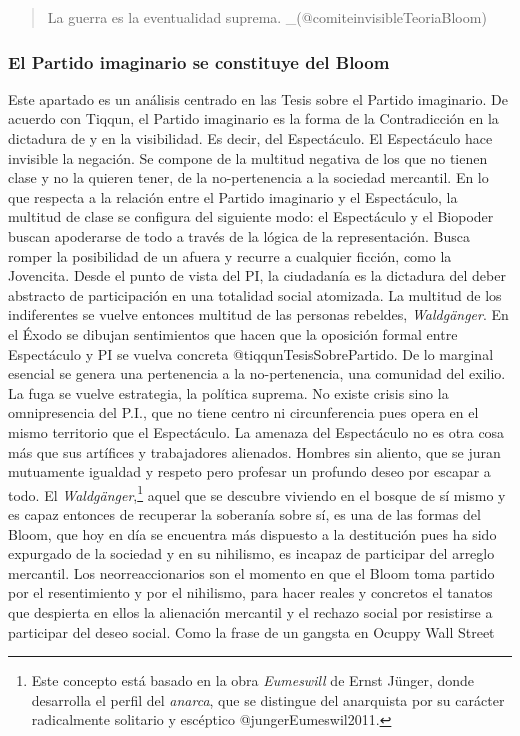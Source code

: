 \documentclass[
]{article}
\begin{document}
\begin{quote}
La guerra es la eventualidad suprema. \_(@comiteinvisibleTeoriaBloom)
\end{quote}

\hypertarget{el-partido-imaginario-se-constituye-del-bloom}{%
\subsubsection{El Partido imaginario se constituye del
Bloom}\label{el-partido-imaginario-se-constituye-del-bloom}}

Este apartado es un análisis centrado en las Tesis sobre el Partido
imaginario. De acuerdo con Tiqqun, el Partido imaginario es la forma de
la Contradicción en la dictadura de y en la visibilidad. Es decir, del
Espectáculo. El Espectáculo hace invisible la negación. Se compone de la
multitud negativa de los que no tienen clase y no la quieren tener, de
la no-pertenencia a la sociedad mercantil. En lo que respecta a la
relación entre el Partido imaginario y el Espectáculo, la multitud de
clase se configura del siguiente modo: el Espectáculo y el Biopoder
buscan apoderarse de todo a través de la lógica de la representación.
Busca romper la posibilidad de un afuera y recurre a cualquier ficción,
como la Jovencita. Desde el punto de vista del PI, la ciudadanía es la
dictadura del deber abstracto de participación en una totalidad social
atomizada. La multitud de los indiferentes se vuelve entonces multitud
de las personas rebeldes, \emph{Waldgänger}. En el Éxodo se dibujan
sentimientos que hacen que la oposición formal entre Espectáculo y PI se
vuelva concreta @tiqqunTesisSobrePartido. De lo marginal esencial se
genera una pertenencia a la no-pertenencia, una comunidad del exilio. La
fuga se vuelve estrategia, la política suprema. No existe crisis sino la
omnipresencia del P.I., que no tiene centro ni circunferencia pues opera
en el mismo territorio que el Espectáculo. La amenaza del Espectáculo no
es otra cosa más que sus artífices y trabajadores alienados. Hombres sin
aliento, que se juran mutuamente igualdad y respeto pero profesar un
profundo deseo por escapar a todo. El \emph{Waldgänger},\footnote{Este
  concepto está basado en la obra \emph{Eumeswill} de Ernst Jünger,
  donde desarrolla el perfil del \emph{anarca}, que se distingue del
  anarquista por su carácter radicalmente solitario y escéptico
  @jungerEumeswil2011. } aquel que se descubre viviendo en el bosque de
sí mismo y es capaz entonces de recuperar la soberanía sobre sí, es una
de las formas del Bloom, que hoy en día se encuentra más dispuesto a la
destitución pues ha sido expurgado de la sociedad y en su nihilismo, es
incapaz de participar del arreglo mercantil. Los neorreaccionarios son
el momento en que el Bloom toma partido por el resentimiento y por el
nihilismo, para hacer reales y concretos el tanatos que despierta en
ellos la alienación mercantil y el rechazo social por resistirse a
participar del deseo social. Como la frase de un gangsta en Ocuppy Wall
Street
\end{document}
